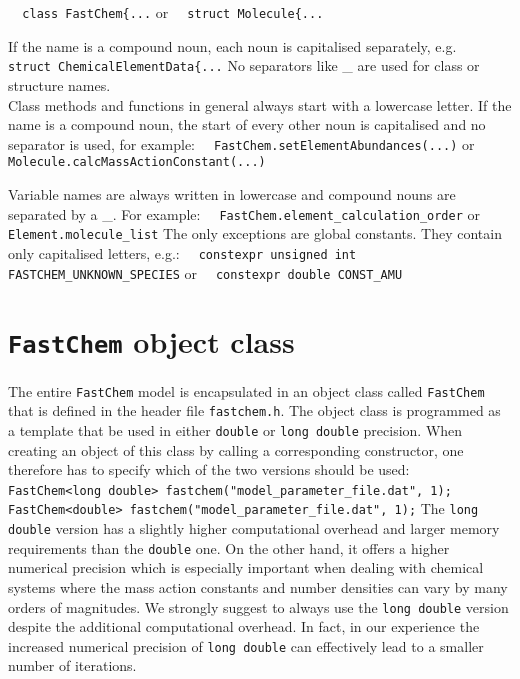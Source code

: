 \documentclass[numbers=noenddot]{aux/fcmanual}
\newcommand{\fc}{\texttt{FastChem}\xspace}
\begin{document}
\bigbreak
\lstinline!  class FastChem{...!
\bigbreak
or
\bigbreak
\lstinline!  struct Molecule{...!
\bigbreak

If the name is a compound noun, each noun is capitalised separately, e.g.
\bigbreak
\lstinline!  struct ChemicalElementData{...!
\bigbreak
No separators like \_ are used for class or structure names.\\

Class methods and functions in general always start with a lowercase letter. If the name is a compound noun, the start of every other noun is capitalised and no separator is used, for example:
\bigbreak
\lstinline!  FastChem.setElementAbundances(...)!
\bigbreak
or
\bigbreak
\lstinline!  Molecule.calcMassActionConstant(...)!
\bigbreak

Variable names are always written in lowercase and compound nouns are separated by a \_. For example:
\bigbreak
\lstinline!  FastChem.element_calculation_order!
\bigbreak
or
\bigbreak
\lstinline!  Element.molecule_list!
\bigbreak
The only exceptions are global constants. They contain only capitalised letters, e.g.:
\bigbreak
\lstinline!  constexpr unsigned int FASTCHEM_UNKNOWN_SPECIES!
\bigbreak
or
\bigbreak
\lstinline!  constexpr double CONST_AMU!
\bigbreak


\section{\fc object class}

The entire \fc model is encapsulated in an object class called \fc that is defined in the header file \verb|fastchem.h|. The object class is programmed as a template that be used in either \verb|double| or \verb|long double| precision. When creating an object of this class by calling a corresponding constructor, one therefore has to specify which of the two versions should be used:
\bigbreak
\lstinline!  FastChem<long double> fastchem("model_parameter_file.dat", 1);!
\bigbreak
\lstinline!  FastChem<double> fastchem("model_parameter_file.dat", 1);!
\bigbreak
The \verb|long double| version has a slightly higher computational overhead and larger memory requirements than the \verb|double| one. On the other hand, it offers a higher numerical precision which is especially important when dealing with chemical systems where the mass action constants and number densities can vary by many orders of magnitudes. We strongly suggest to always use the \verb|long double| version despite the additional computational overhead. In fact, in our experience the increased numerical precision of \verb|long double| can effectively lead to a smaller number of iterations.
\end{document}
